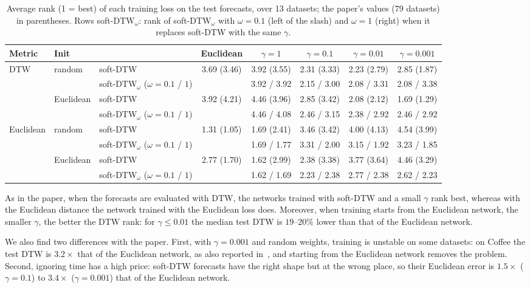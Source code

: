 \documentclass[11pt]{article}
\begin{document}
\begin{table}[h]
\centering\small
\caption{Average rank (1 = best) of each training loss on the test forecasts, over 13 datasets; the paper's values (79 datasets) in parentheses. Rows soft-DTW$_\omega$: rank of soft-DTW$_\omega$ with $\omega=0.1$ (left of the slash) and $\omega=1$ (right) when it replaces soft-DTW with the same $\gamma$.}
\label{tab:forecast}
\setlength{\tabcolsep}{2.6pt}
\begin{tabular}{lllccccc}
\toprule
Metric & Init & & Euclidean & $\gamma=1$ & $\gamma=0.1$ & $\gamma=0.01$ & $\gamma=0.001$ \\
\midrule
\multirow{4}{*}{DTW} & \multirow{2}{*}{random} & soft-DTW & 3.69 (3.46) & 3.92 (3.55) & 2.31 (3.33) & 2.23 (2.79) & 2.85 (1.87) \\
& & soft-DTW$_\omega$ ($\omega=0.1$ / $1$) & & 3.92 / 3.92 & 2.15 / 3.00 & 2.08 / 3.31 & 2.08 / 3.38 \\
& \multirow{2}{*}{Euclidean} & soft-DTW & 3.92 (4.21) & 4.46 (3.96) & 2.85 (3.42) & 2.08 (2.12) & 1.69 (1.29) \\
& & soft-DTW$_\omega$ ($\omega=0.1$ / $1$) & & 4.46 / 4.08 & 2.46 / 3.15 & 2.38 / 2.92 & 2.46 / 2.92 \\
\midrule
\multirow{4}{*}{Euclidean} & \multirow{2}{*}{random} & soft-DTW & 1.31 (1.05) & 1.69 (2.41) & 3.46 (3.42) & 4.00 (4.13) & 4.54 (3.99) \\
& & soft-DTW$_\omega$ ($\omega=0.1$ / $1$) & & 1.69 / 1.77 & 3.31 / 2.00 & 3.15 / 1.92 & 3.23 / 1.85 \\
& \multirow{2}{*}{Euclidean} & soft-DTW & 2.77 (1.70) & 1.62 (2.99) & 2.38 (3.38) & 3.77 (3.64) & 4.46 (3.29) \\
& & soft-DTW$_\omega$ ($\omega=0.1$ / $1$) & & 1.62 / 1.69 & 2.23 / 2.38 & 2.77 / 2.38 & 2.62 / 2.23 \\
\bottomrule
\end{tabular}
\end{table}

As in the paper, when the forecasts are evaluated with DTW, the networks trained with soft-DTW and a small $\gamma$ rank best, whereas with the Euclidean distance the network trained with the Euclidean loss does. Moreover, when training starts from the Euclidean network, the smaller $\gamma$, the better the DTW rank: for $\gamma\le0.01$ the median test DTW is $19$--$20\%$ lower than that of the Euclidean network.

We also find two differences with the paper. First, with $\gamma=0.001$ and random weights, training is unstable on some datasets: on Coffee the test DTW is $3.2\times$ that of the Euclidean network, as also reported in~\cite{zeitler2023stabilizing}, and starting from the Euclidean network removes the problem. Second, ignoring time has a high price: soft-DTW forecasts have the right shape but at the wrong place, so their Euclidean error is $1.5\times$ ($\gamma=0.1$) to $3.4\times$ ($\gamma=0.001$) that of the Euclidean network.
\end{document}
